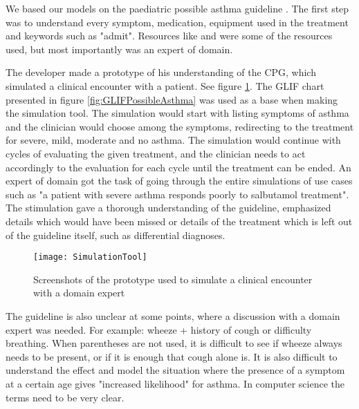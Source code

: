 We based our models on the paediatric possible asthma guideline \cite{RepublicofKeny2016}. The first step was to understand every symptom, medication, equipment used in the treatment and keywords such as "admit". Resources like \textcite{Disease2011} and \textcite{Johansen2018} were some of the resources used, but most importantly was an expert of domain. 

The developer made a prototype of his understanding of the CPG, which simulated a clinical encounter with a patient. See figure \ref{fig:SimulationTool}. The GLIF chart presented in figure \ref{fig:GLIFPossibleAsthma} was used as a base when making the simulation tool. The simulation would start with listing symptoms of asthma and the clinician would choose among the symptoms, redirecting to the treatment for severe, mild, moderate and no asthma. The simulation would continue with cycles of evaluating the given treatment, and the clinician needs to act accordingly to the evaluation for each cycle until the treatment can be ended. An expert of domain got the task of going through the entire simulations of use cases such as "a patient with severe asthma responds poorly to salbutamol treatment". The stimulation gave a thorough understanding of the guideline, emphasized details which would have been missed or details of the treatment which is left out of the guideline itself, such as differential diagnoses.

\begin{figure}[h!]
	\caption {Screenshots of the prototype used to simulate a clinical encounter with a domain expert}
	\label{fig:SimulationTool}
	\texttt{[image: SimulationTool]}
\end{figure}

The guideline is also unclear at some points, where a discussion with a domain expert was needed. For example: wheeze + history of cough or difficulty breathing. When parentheses are not used, it is difficult to see if wheeze always needs to be  present, or if it is enough that cough alone is. It is also difficult to understand the effect and model the situation where the presence of a symptom at a certain age gives "increased likelihood" for asthma. In computer science the terms need to be very clear.

